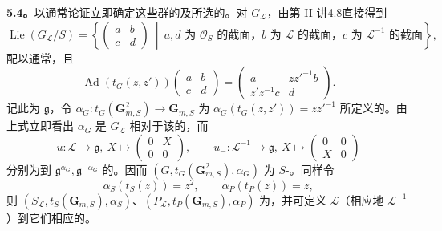 \textbf{5.4。}以通常论证立即确定这些群的及所选的。对 $G_{\mathscr L}$，由第 II 讲4.8直接得到
\[\operatorname{Lie}(G_{\mathscr L}/S)=\left\{\begin{pmatrix}a&b\\c&d\end{pmatrix}\ \middle|\ a,d\text{ 为 }\mathscr O_S\text{ 的截面，}b\text{ 为 }\mathscr L\text{ 的截面，}c\text{ 为 }\mathscr L^{-1}\text{ 的截面}\right\},\]
配以通常，且
\[\operatorname{Ad}(t_G(z,z'))\begin{pmatrix}a&b\\c&d\end{pmatrix}=\begin{pmatrix}a&zz'^{-1}b\\z'z^{-1}c&d\end{pmatrix}.\]
记此为 $\mathfrak g$，令 $\alpha_G:t_G(\mathbf G_{m,S}^2)\to\mathbf G_{m,S}$ 为 $\alpha_G(t_G(z,z'))=zz'^{-1}$ 所定义的。由上式立即看出 $\alpha_G$ 是 $G_{\mathscr L}$ 相对于该的，而
\[u:\mathscr L\to\mathfrak g,\ X\mapsto\begin{pmatrix}0&X\\0&0\end{pmatrix},\qquad u_-:\mathscr L^{-1}\to\mathfrak g,\ X\mapsto\begin{pmatrix}0&0\\X&0\end{pmatrix}\]
分别为到 $\mathfrak g^{\alpha_G},\mathfrak g^{-\alpha_G}$ 的。因而 $(G,t_G(\mathbf G_{m,S}^2),\alpha_G)$ 为 $S$-。同样令
\[\alpha_S(t_S(z))=z^2,\qquad\alpha_P(t_P(z))=z,\]
则 $(S_{\mathscr L},t_S(\mathbf G_{m,S}),\alpha_S)$、$(P_{\mathscr L},t_P(\mathbf G_{m,S}),\alpha_P)$ 为，并可定义 $\mathscr L$（相应地 $\mathscr L^{-1}$）到它们相应的。

